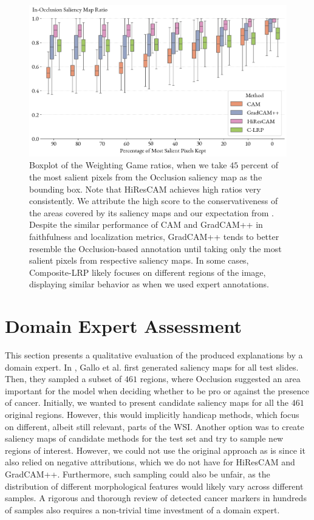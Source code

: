 \begin{figure}[t]
    \centering
    \includegraphics[width=\textwidth]{img/occlusion-weighting-game-boxplot.png}
    \caption{
    Boxplot of the Weighting Game ratios, when we take $45$ percent of the most salient pixels from the Occlusion saliency map as the bounding box.
    Note that HiResCAM achieves high ratios very consistently.
    We attribute the high score to the conservativeness of the areas covered by its saliency maps and our expectation from .
    Despite the similar performance of CAM and GradCAM++ in faithfulness and localization metrics, GradCAM++ tends to better resemble the Occlusion-based annotation until taking only the most salient pixels from respective saliency maps.
    In some cases, Composite-LRP likely focuses on different regions of the image, displaying similar behavior as when we used expert annotations.
    }
    \label{fig:occ-weighting-game-boxplot}
\end{figure}

\section{Domain Expert Assessment}

This section presents a qualitative evaluation of the produced explanations by a domain expert.
In \cite{gallo}, Gallo et al. first generated saliency maps for all test slides.
Then, they sampled a subset of $461$ regions, where Occlusion suggested an area important for the model when deciding whether to be pro or against the presence of cancer.
Initially, we wanted to present candidate saliency maps for all the $461$ original regions.
However, this would implicitly handicap methods, which focus on different, albeit still relevant, parts of the WSI. 
Another option was to create saliency maps of candidate methods for the test set and try to sample new regions of interest.
However, we could not use the original approach as is since it also relied on negative attributions, which we do not have for HiResCAM and GradCAM++.
Furthermore, such sampling could also be unfair, as the distribution of different morphological features would likely vary across different samples.
A rigorous and thorough review of detected cancer markers in hundreds of samples also requires a non-trivial time investment of a domain expert.

